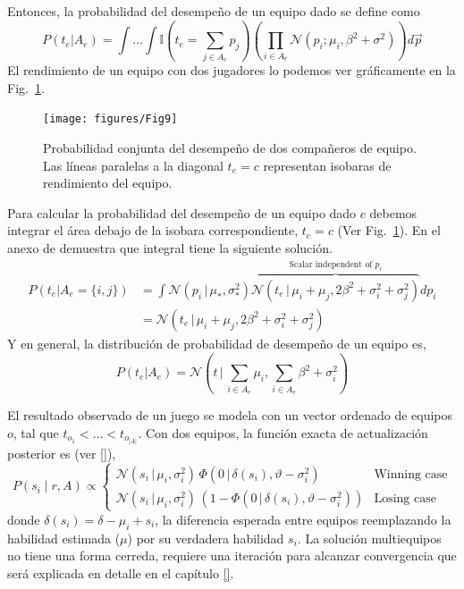 \documentclass[a4paper,11pt]{book}
\newcommand{\N}{\mathcal{N}}
\theoremstyle{definition}
\begin{document}
Entonces, la probabilidad del desempeño de un equipo dado se define como
\begin{equation}
 P(t_e|A_e) = \int \dots \int \mathbb{I}(t_e = \sum_{j\in A_e } p_j ) \left(\prod_{i \in A_e} \N(p_i;\mu_i,\beta^2 + \sigma^2) \right) d\vec{p}
\end{equation}
%
El rendimiento de un equipo con dos jugadores lo podemos ver gráficamente en la Fig.~\ref{paso_3_suma_normales_image}.
%
\begin{figure}[ht!]
\centering
\texttt{[image: figures/Fig9]}
\caption{Probabilidad conjunta del desempeño de dos compañeros de equipo.
Las líneas paralelas a la diagonal $ t_e = c $ representan isobaras de rendimiento del equipo.}
\label{paso_3_suma_normales_image}
\end{figure}
%
Para calcular la probabilidad del desempeño de un equipo dado $c$ debemos integrar el área debajo de la isobara correspondiente, $ t_e = c $ (Ver Fig.~\ref{paso_3_suma_normales_image}).
%
En el anexo de demuestra que integral tiene la siguiente solución.
%
\begin{equation}
\begin{split}
 P(t_e|A_e=\{i,j\}) & = \int \N(p_i\, |\,\mu_{*},\sigma_{*}^2) \overbrace{\N(t_e\,|\,\mu_i+\mu_j,2\beta^2 + \sigma_i^2 + \sigma_j^2)}^{\text{Scalar independent of $p_i$}} dp_i \\[0.3cm]
& = \N(t_e \,|\, \mu_i+\mu_j,2\beta^2 + \sigma_i^2 + \sigma_j^2)
\end{split}
\end{equation}
%
Y en general, la distribución de probabilidad de desempeño de un equipo es,
\begin{equation}
P(t_e|A_e) = \N\left(t\,|\,\sum_{i\in A_e} \mu_i,\sum_{i\in A_e} \beta^2 + \sigma_i^2\right)
\end{equation}

El resultado observado de un juego se modela con un vector ordenado de equipos $o$, tal que $t_{o_1}< \dots < t_{o_{|A|}}$.
%
Con dos equipos, la función exacta de actualización posterior es (ver \ref{}),
%
\begin{equation}
 P(s_i \mid r, A) \propto
 \begin{cases}
  \N(s_i \, | \, \mu_i, \sigma_i^2) \, \Phi(0 \, | \, \delta(s_i), \vartheta - \sigma_i^2) & \text{Winning case} \\
  \N(s_i \, | \, \mu_i, \sigma_i^2 ) \, (1 - \Phi(0 \, | \, \delta(s_i), \vartheta - \sigma_i^2)) & \text{Losing case}
 \end{cases}
\end{equation}
%
donde $\delta(s_i) = \delta - \mu_i + s_i$, la diferencia esperada entre equipos reemplazando la habilidad estimada ($\mu$) por su verdadera habilidad $s_i$.
%
La solución multiequipos no tiene una forma cerreda, requiere una iteración para alcanzar convergencia que será explicada en detalle en el capítulo \ref{}.
\end{document}
